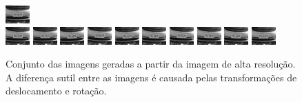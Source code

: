 \begin{figure}[H]
	\includegraphics{figures/degradedImg/result-9.png} \\
	\includegraphics{figures/degradedImg/result-10.png}
	\includegraphics{figures/degradedImg/result-11.png}
	\includegraphics{figures/degradedImg/result-12.png}
	\includegraphics{figures/degradedImg/result-13.png}
	\includegraphics{figures/degradedImg/result-14.png}
	\includegraphics{figures/degradedImg/result-15.png}
	\includegraphics{figures/degradedImg/result-16.png}
	\includegraphics{figures/degradedImg/result-17.png}
	\includegraphics{figures/degradedImg/result-18.png}
	\includegraphics{figures/degradedImg/result-19.png}
	\caption{Conjunto das imagens geradas a partir da imagem de alta resolução. A diferença sutil entre as imagens é causada pelas transformações de deslocamento e rotação.}
	\label{fig:frames}
\end{figure}

